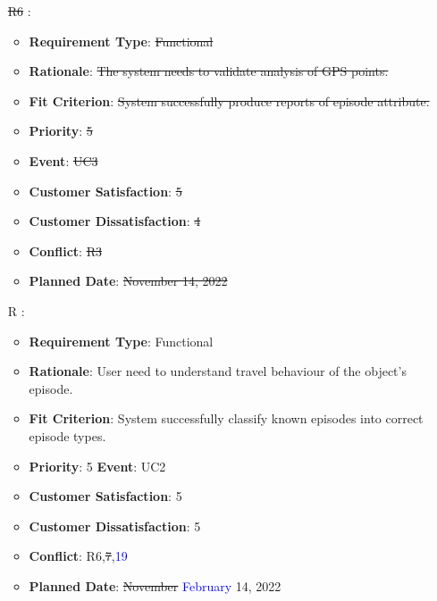 \documentclass[12pt, titlepage]{article}
\newcounter{reqnum} %
\begin{document}
\begin{itemize}
\item[\sout{R6}
\label{R_Inputs_1}:] 
\begin{itemize}
    \item \textbf{Requirement Type}: \sout{Functional}
    \item \textbf{Rationale}: \sout{The system needs to validate  analysis of GPS points.}
    \item \textbf{Fit Criterion}: \sout{System successfully produce reports of episode attribute.}
    \item \textbf{Priority}: \sout{5}
    \item \textbf{Event}: \sout{UC3}
    \item \textbf{Customer Satisfaction}: \sout{5}
    \item \textbf{Customer Dissatisfaction}: \sout{4}
    \item \textbf{Conflict}: \sout{R3}
    \item \textbf{Planned Date}: \sout{November 14, 2022}
\end{itemize}

\item[R\refstepcounter{reqnum}\thereqnum
\label{R_Inputs_1}:] 
\begin{itemize}
    \item \textbf{Requirement Type}: Functional
    \item \textbf{Rationale}: User need to understand travel behaviour of the object's episode.
    \item \textbf{Fit Criterion}: System successfully classify known episodes into correct episode types. 
    \item \textbf{Priority}: 5
    \textbf{Event}: UC2
    \item \textbf{Customer Satisfaction}: 5
    \item \textbf{Customer Dissatisfaction}: 5
    \item \textbf{Conflict}: R6,\sout{7},\textcolor{blue}{19}
    \item \textbf{Planned Date}: \sout{November} \textcolor{blue}{February} 14, 2022
\end{itemize}


\end{itemize}
\end{document}

